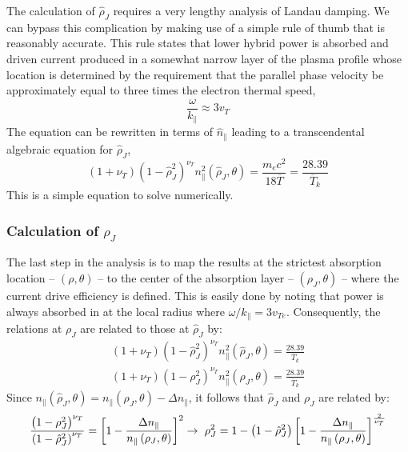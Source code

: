 The calculation of $\hat \rho_J$ requires a very lengthy analysis of Landau damping. We can bypass this complication by making use of a simple rule of thumb that is reasonably accurate. This rule states that lower hybrid power is absorbed and driven current produced in a somewhat narrow layer of the plasma profile whose location is determined by the requirement that the parallel phase velocity be approximately equal to three times the electron thermal speed,
\begin{equation}
	\frac { \omega } { k _ { \| } } \approx 3 v _ { T }
\end{equation}
The equation can be rewritten in terms of $\hat n_\parallel$ leading to a transcendental algebraic equation for $\hat \rho_J$,
\begin{equation}
	\left( 1 + \nu _ { T } \right) \left( 1 - \hat { \rho } _ { J } ^ { 2 } \right) ^ { \nu _ { T } } n _ { \| } ^ { 2 } \left( \hat { \rho } _ { J } , \theta \right) = \frac { m _ { e } c ^ { 2 } } { 18 \overline { T } } = \frac { 28.39 } { \overline { T } _ { k } }
\end{equation}
This is a simple equation to solve numerically.

\subsubsection{Calculation of $\rho_J$}
The last step in the analysis is to map the results at the strictest absorption location -- $(\rho, \theta)$ -- to the center of the absorption layer -- $(\rho_J, \theta)$ -- where the current drive efficiency is defined. This is easily done by noting that power is always absorbed in at the local radius where $\omega / k _ { \| } = 3 v _ { T e }$. Consequently, the relations at $\rho_J$ are related to those at $\hat \rho_J$ by:
\begin{gather}
	\left( 1 + \nu _ { T } \right) \left( 1 - \hat { \rho } _ { J } ^ { 2 } \right) ^ { \nu _ { T } } n _ { \| } ^ { 2 } \left( \hat { \rho } _ { J } , \theta \right) = \frac { 28.39 } { \overline { T } _ { k } } \\
	\left( 1 + \nu _ { T } \right) \left( 1 - \rho _ { J } ^ { 2 } \right) ^ { \nu _ { T } } n _ { \| } ^ { 2 } \left( \rho _ { J } , \theta \right) = \frac { 28.39 } { \overline { T } _ { k } }
\end{gather}
Since $n _ { \| } \left( \hat { \rho } _ { J } , \theta \right) = n _ { \| } \left( \rho _ { J } , \theta \right) - \Delta n _ { \| }$, it follows that $\hat \rho_J$ and $\rho_J$ are related by:
\begin{equation}
	\small
	\frac { \left( 1 - \rho _ { J } ^ { 2 } \right) ^ { \nu _ { T } } } { \left( 1 - \hat { \rho } _ { J } ^ { 2 } \right) ^ { \nu _ { T } } } = \left[ 1 - \frac { \Delta n _ { \| } } { n _ { \| } \left( \rho _ { J } , \theta \right) } \right] ^ { 2 } \rightarrow \ \rho _ { J } ^ { 2 } = 1 - \left( 1 - \hat { \rho } _ { J } ^ { 2 } \right) \left[ 1 - \frac { \Delta n _ { \| } } { n _ { \| } \left( \rho _ { J } , \theta \right) } \right] ^ { \frac{2}{\nu _ { T }} }
\end{equation}

